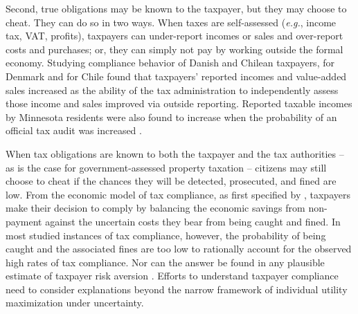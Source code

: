 \documentclass[12pt,titlepage]{article}
\begin{document}
Second, true obligations may be known to the taxpayer, but they may
choose to cheat.  They can do so in two ways.  When taxes are
self-assessed (\textit{e.g.}, income tax, VAT, profits), taxpayers can
under-report incomes or sales and over-report costs and purchases; 
or, they can simply not pay by working outside the formal economy. 
Studying compliance behavior of Danish and Chilean taxpayers, 
\citet{kleven} for Denmark and \citet{pomeranz}
for Chile found that taxpayers’ reported incomes and value-added
sales increased as the ability of the tax administration to
independently assess those income and sales improved via outside
reporting.   Reported taxable incomes by Minnesota residents were
also found to increase when the probability of an official tax audit
was increased \citep{blumenthal}.  

When tax obligations are known to both the taxpayer and the tax
authorities – as is the case for government-assessed property
taxation – citizens may still choose to cheat if the chances they
will be detected, prosecuted, and fined are low.  From the economic
model of tax compliance, as first specified by \citet{allingham},
taxpayers make their decision to comply by balancing the economic
savings from non-payment against the uncertain costs they bear from
being caught and fined.  In most studied instances of tax compliance,
however, the probability of being caught and the associated fines are
too low to rationally account for the observed high rates of tax
compliance.    Nor can the answer be found in any plausible estimate
of taxpayer risk aversion \citep{alm}. Efforts to understand taxpayer 
compliance need to consider explanations beyond the narrow framework of 
individual utility maximization under uncertainty.  
\end{document}
